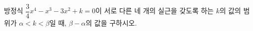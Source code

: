 방정식 $\dfrac{3}{4}x^4-x^3-3x^2+k=0$이 서로 다른 네 개의 실근을 갖도록 하는 $k$의 값의 범위가 $\alpha<k<\beta$일 때, $\beta-\alpha$의 값을 구하시오.
